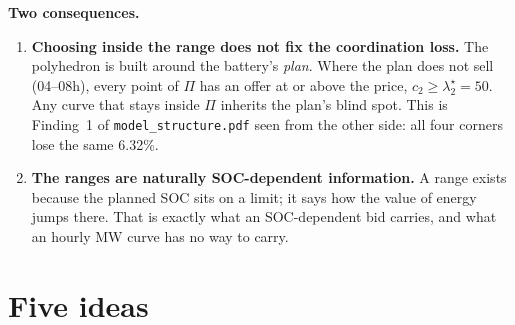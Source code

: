 \documentclass[10pt,a4paper]{article}
\newcommand{\code}[1]{\texttt{#1}}
\newcommand{\lamstar}{\lambda^{\star}}
\begin{document}
\textbf{Two consequences.}
\begin{enumerate}
  \item \textbf{Choosing inside the range does not fix the coordination loss.} The polyhedron is built around the
    battery's \emph{plan}. Where the plan does not sell (04--08h), every point of $\Pi$ has an offer at or above
    the price, $c_2\ge\lamstar_2=50$. Any curve that stays inside $\Pi$ inherits the plan's blind spot. This is
    Finding~1 of \code{model\_structure.pdf} seen from the other side: all four corners lose the same 6.32\%.
  \item \textbf{The ranges are naturally SOC-dependent information.} A range exists because the planned SOC sits on
    a limit; it says how the value of energy jumps there. That is exactly what an SOC-dependent bid carries, and what
    an hourly MW curve has no way to carry.
\end{enumerate}

\section{Five ideas}
\end{document}
